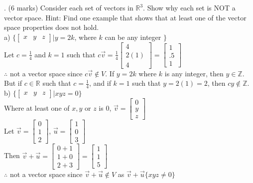 \documentclass[a4paper]{article}
\begin{document}
. (6 marks) Consider each set of vectors in $\mathbb{R}^3$. Show why each set is NOT a vector space. Hint: Find one example that shows that at least one of the vector space properties does not hold.\\
a) $\{\begin{bmatrix}
x&y&z
\end{bmatrix} | y = 2k$, where $k$ can be any integer $\}$\\
Let $c = \frac{1}{4}$ and $k = 1$ such that $c\vec{v} = \frac{1}{4}\begin{bmatrix}
4\\
2(1)\\
4
\end{bmatrix} = \begin{bmatrix}
1\\
.5\\
1
\end{bmatrix}$\\
$\therefore$ not a vector space since $c\vec{v} \notin V$. If $y = 2k$ where $k$ is any integer, then $y \in \mathbb{Z}$. But if $c \in \mathbb{R}$ such that $c = \frac{1}{4}$, and if $k = 1$ such that $y = 2(1) = 2$, then $cy \notin \mathbb{Z}$.\\
b) $\{\begin{bmatrix}
x&y&z
\end{bmatrix} | xyz = 0 \}$\\
Where at least one of $x,y$ or $z$ is $0$, $\vec{v} = \begin{bmatrix}
0\\
y\\
z
\end{bmatrix}$\\
Let $\vec{v} = \begin{bmatrix}
0\\
1\\
2
\end{bmatrix}$, $\vec{u} = \begin{bmatrix}
1\\
0\\
3
\end{bmatrix}$\\
Then $\vec{v} + \vec{u} = \begin{bmatrix}
0+1\\
1+0\\
2+3
\end{bmatrix} = \begin{bmatrix}
1\\
1\\
5
\end{bmatrix}$\\
$\therefore$ not a vector space since $\vec{v} + \vec{u} \notin V$ as $\vec{v} + \vec{u} \{xyz \neq 0 \}$\\
\end{document}
